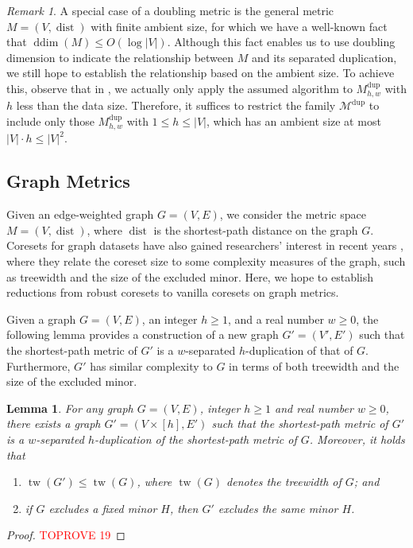 \documentclass[letterpaper,11pt]{article}
\theoremstyle{plain}
\newtheorem{lemma}[theorem]{Lemma}
\theoremstyle{definition}
\theoremstyle{remark}
\newtheorem{remark}[theorem]{Remark}
\DeclareMathOperator{\ddim}{ddim}
\DeclareMathOperator{\tw}{tw}
\DeclareMathOperator{\dist}{dist}
\newcommand{\dup}{\mathrm{dup}}
\newcommand{\calM}{\mathcal{M}}
\begin{document}
\begin{appendices}
\begin{remark}
    \label{remark:finite}
    A special case of a doubling metric is the general metric $M=(V,\dist)$ with finite ambient size, for which we have a well-known fact that $\ddim(M)\le O(\log |V|)$. Although this fact enables us to use doubling dimension to indicate the relationship between $M$ and its separated duplication, we still hope to establish the relationship based on the ambient size. To achieve this, observe that in , we actually only apply the assumed algorithm to $M^\dup_{h,w}$ with $h$ less than the data size. 
    Therefore, it suffices to restrict the family $\calM^\dup$ to include only those $M^\dup_{h,w}$ with $1 \leq h \leq |V|$, which has an ambient size at most $|V|\cdot h\leq |V|^2$.
\end{remark}

\subsection{Graph Metrics}

Given an edge-weighted graph $G=(V,E)$, we consider the metric space $M=(V,\dist)$, where $\dist$ is the shortest-path distance on the graph $G$. Coresets for graph datasets have also gained researchers' interest in recent years \cite{DBLP:conf/icml/BakerBHJK020, BJKW21, Cohen-addad2021New,Cohen-AddadD0SS25}, where they relate the coreset size to some complexity measures of the graph, such as treewidth and the size of the excluded minor. Here, we hope to establish reductions from robust coresets to vanilla coresets on graph metrics.

Given a graph $G=(V,E)$, an integer $h\geq 1$, and a real number $w\geq 0$, the following lemma provides a construction of a new graph $G'=(V',E')$ such that the shortest-path metric of $G'$ is a $w$-separated $h$-duplication of that of $G$. Furthermore, $G'$ has similar complexity to $G$ in terms of both treewidth and the size of the excluded minor.

\begin{lemma}
    \label{lem:duplication graph}
    For any graph $G=(V,E)$, integer $h\geq 1$ and real number $w\geq 0$, there exists a graph $G'=(V\times [h], E')$ such that the shortest-path metric of $G'$ is a $w$-separated $h$-duplication of the shortest-path metric of $G$. Moreover, it holds that
    \begin{enumerate}
        \item $\tw(G')\leq \tw(G)$, where $\tw(G)$ denotes the treewidth of $G$; and
        \item if $G$ excludes a fixed minor $H$, then $G'$ excludes the same minor $H$.
    \end{enumerate}
\end{lemma}
\begin{proof}\textcolor{red}{TOPROVE 19}\end{proof}



\end{appendices}
\end{document}

